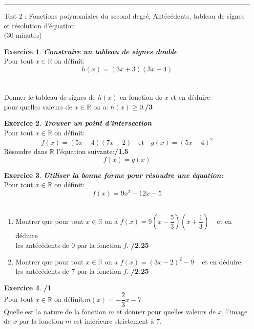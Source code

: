 \documentclass[a4paper,10pt]{article}
\theoremstyle{definition}
\newtheorem{exo}{Exercice}
\newcommand{\R}{\mathbb{R}}
\begin{document}
	
	\rule[0.5ex]{\textwidth}{0.1mm}	
	
	\begin{center}
		\large \sc Test 2 : Fonctions polynomiales du second degré, Antécédents, tableau de signes et résolution d'équation\\[0.2cm]
		(30 minutes)
	\end{center}
\begin{exo} \textit{\textbf{Construire un tableau de signes double}}\\[0.2cm]
	Pour tout  $x\in\R$ on définit: $$h(x) = (3x+3)(3x-4)$$ \hfill\\\\[-0.5cm] Donner le tableau de signes de $h(x)$ en fonction de $x$ et en déduire\\ pour quelles valeurs de $x\in\R$ on a:\quad 
	$h(x) \geq 0$.\hfill\textbf{/3}\\[10cm]
\end{exo}




\begin{exo} \textit{\textbf{Trouver un point d'intersection}}\\[0.2cm]
	Pour tout  $x\in\R$ on définit:$$f(x) = (5x-4)(7x-2) \quad \text{et} \quad g(x) = (5x-4)^2$$
Résoudre dans $\R$ l'équation suivante:\hfill\textbf{/1.5} 
$$f(x) = g(x) $$	%

\end{exo}
\newpage
\lhead{}\chead{}\rhead{}\cfoot{\thepage}\renewcommand{\headrulewidth}{0pt}\renewcommand{\footrulewidth}{0.4pt}%

\begin{exo} \textit{\textbf{Utiliser la bonne forme pour résoudre une équation:}}\\[0.2cm]
	Pour tout  $x\in\R$ on définit: $$f(x)= 9x^2-12x-5 $$ 
	\hfill\\
	\begin{enumerate}
		\item Montrer que pour tout $x\in\R$ on a $f(x)= 9(x- \dfrac{5}{3})(x+ \dfrac{1}{3}) $ ~  	et en déduire \\
		les antécédents de $0$ par la fonction $f$. \hfill\textbf{/2.25}\\[7cm]
		
		\item Montrer que pour tout $x\in\R$ on a $f(x)= (3x- 2)^2-9 $ ~  	et en déduire \\
		les antécédents de $7$ par la fonction $f$. \hfill\textbf{/2.25}\\[7cm]
	\end{enumerate}
	
\end{exo}

\begin{exo} \hfill\textbf{/1}\\[0.2cm]
\noindent Pour tout  $x\in\R$ on définit:\quad $m(x) = -\dfrac{2}{3}x - 7 $  \\[0.2cm] 
\noindent Quelle est la nature de la fonction $m$ et donner pour quelles valeurs de $x$, l'image de $x$ par la fonction $m$ est inférieure strictement à $7$.

\end{exo}
\end{document}
